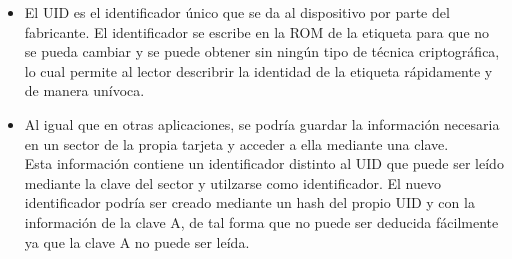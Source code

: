 \documentclass[10pt,a4paper]{article}
\begin{document}
\begin{itemize}
\item El UID es el identificador único que se da al dispositivo por parte del fabricante. El identificador se escribe en la ROM de la etiqueta para que no se pueda cambiar y se puede obtener sin ningún tipo de técnica criptográfica, lo cual permite al lector describrir la identidad de la etiqueta rápidamente y de manera unívoca.
\item Al igual que en otras aplicaciones, se podría guardar la información necesaria en un sector de la propia tarjeta y acceder a ella mediante una clave. \\
Esta información contiene un identificador distinto al UID que puede ser leído mediante la clave del sector y utilzarse como identificador. El nuevo identificador podría ser creado mediante un hash del propio UID y con la información de la clave A, de tal forma que no puede ser deducida fácilmente ya que la clave A no puede ser leída.
\end{itemize}
\end{document}

